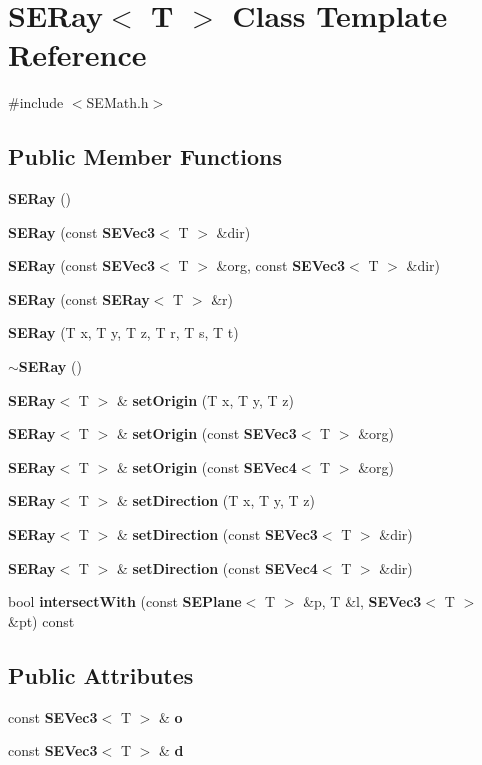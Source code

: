 \section{S\+E\+Ray$<$ T $>$ Class Template Reference}
\label{class_s_e_ray}


{\ttfamily \#include $<$S\+E\+Math.\+h$>$}

\subsection*{Public Member Functions}
\begin{DoxyCompactItemize}
\item 
{\bf S\+E\+Ray} ()
\item 
{\bf S\+E\+Ray} (const {\bf S\+E\+Vec3}$<$ T $>$ \&dir)
\item 
{\bf S\+E\+Ray} (const {\bf S\+E\+Vec3}$<$ T $>$ \&org, const {\bf S\+E\+Vec3}$<$ T $>$ \&dir)
\item 
{\bf S\+E\+Ray} (const {\bf S\+E\+Ray}$<$ T $>$ \&r)
\item 
{\bf S\+E\+Ray} (T x, T y, T z, T r, T s, T t)
\item 
{\bf $\sim$\+S\+E\+Ray} ()
\item 
{\bf S\+E\+Ray}$<$ T $>$ \& {\bf set\+Origin} (T x, T y, T z)
\item 
{\bf S\+E\+Ray}$<$ T $>$ \& {\bf set\+Origin} (const {\bf S\+E\+Vec3}$<$ T $>$ \&org)
\item 
{\bf S\+E\+Ray}$<$ T $>$ \& {\bf set\+Origin} (const {\bf S\+E\+Vec4}$<$ T $>$ \&org)
\item 
{\bf S\+E\+Ray}$<$ T $>$ \& {\bf set\+Direction} (T x, T y, T z)
\item 
{\bf S\+E\+Ray}$<$ T $>$ \& {\bf set\+Direction} (const {\bf S\+E\+Vec3}$<$ T $>$ \&dir)
\item 
{\bf S\+E\+Ray}$<$ T $>$ \& {\bf set\+Direction} (const {\bf S\+E\+Vec4}$<$ T $>$ \&dir)
\item 
bool {\bf intersect\+With} (const {\bf S\+E\+Plane}$<$ T $>$ \&p, T \&l, {\bf S\+E\+Vec3}$<$ T $>$ \&pt) const 
\end{DoxyCompactItemize}
\subsection*{Public Attributes}
\begin{DoxyCompactItemize}
\item 
const {\bf S\+E\+Vec3}$<$ T $>$ \& {\bf o}
\item 
const {\bf S\+E\+Vec3}$<$ T $>$ \& {\bf d}
\end{DoxyCompactItemize}


